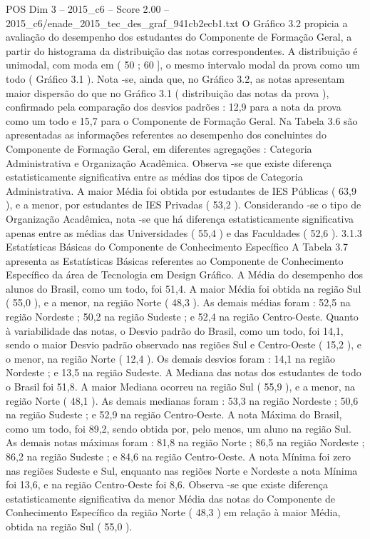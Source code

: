 \begin{textsample}{POS Dim 3 – 2015\_c6 – Score 2.00 – 2015\_c6/enade\_2015\_tec\_des\_graf\_941cb2ecb1.txt}
O Gráfico 3.2 propicia a avaliação do desempenho dos estudantes do Componente de Formação Geral, a partir do histograma da distribuição das notas correspondentes.
A distribuição é unimodal, com moda em ( 50 ; 60 ], o mesmo intervalo modal da prova como um todo ( Gráfico 3.1 ).
Nota -se, ainda que, no Gráfico 3.2, as notas apresentam maior dispersão do que no Gráfico 3.1 ( distribuição das notas da prova ), confirmado pela comparação dos desvios padrões : 12,9 para a nota da prova como um todo e 15,7 para o Componente de Formação Geral.
Na Tabela 3.6 são apresentadas as informações referentes ao desempenho dos concluintes do Componente de Formação Geral, em diferentes agregações : Categoria Administrativa e Organização Acadêmica.
Observa -se que existe diferença estatisticamente significativa entre as médias dos tipos de Categoria Administrativa.
A maior Média foi obtida por estudantes de IES Públicas ( 63,9 ), e a menor, por estudantes de IES Privadas ( 53,2 ).
Considerando -se o tipo de Organização Acadêmica, nota -se que há diferença estatisticamente significativa apenas entre as médias das Universidades ( 55,4 ) e das Faculdades ( 52,6 ). 3.1.3 Estatísticas Básicas do Componente de Conhecimento Específico A Tabela 3.7 apresenta as Estatísticas Básicas referentes ao Componente de Conhecimento Específico da área de Tecnologia em Design Gráfico.
A Média do desempenho dos alunos do Brasil, como um todo, foi 51,4.
A maior Média foi obtida na região Sul ( 55,0 ), e a menor, na região Norte ( 48,3 ).
As demais médias foram : 52,5 na região Nordeste ; 50,2 na região Sudeste ; e 52,4 na região Centro-Oeste.
Quanto à variabilidade das notas, o Desvio padrão do Brasil, como um todo, foi 14,1, sendo o maior Desvio padrão observado nas regiões Sul e Centro-Oeste ( 15,2 ), e o menor, na região Norte ( 12,4 ).
Os demais desvios foram : 14,1 na região Nordeste ; e 13,5 na região Sudeste.
A Mediana das notas dos estudantes de todo o Brasil foi 51,8.
A maior Mediana ocorreu na região Sul ( 55,9 ), e a menor, na região Norte ( 48,1 ).
As demais medianas foram : 53,3 na região Nordeste ; 50,6 na região Sudeste ; e 52,9 na região Centro-Oeste.
A nota Máxima do Brasil, como um todo, foi 89,2, sendo obtida por, pelo menos, um aluno na região Sul.
As demais notas máximas foram : 81,8 na região Norte ; 86,5 na região Nordeste ; 86,2 na região Sudeste ; e 84,6 na região Centro-Oeste.
A nota Mínima foi zero nas regiões Sudeste e Sul, enquanto nas regiões Norte e Nordeste a nota Mínima foi 13,6, e na região Centro-Oeste foi 8,6.
Observa -se que existe diferença estatisticamente significativa da menor Média das notas do Componente de Conhecimento Específico da região Norte ( 48,3 ) em relação à maior Média, obtida na região Sul ( 55,0 ).

\end{textsample}
